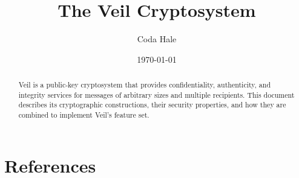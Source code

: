 \documentclass{article}
\title{The Veil Cryptosystem}
\author{Coda Hale}
\date{\today}
\begin{document}
    \clearpage
    \maketitle
    \begin{abstract}
        Veil is a public-key cryptosystem that provides confidentiality, authenticity, and integrity services for
        messages of arbitrary sizes and multiple recipients.
        This document describes its cryptographic constructions, their security properties, and how they are combined to
        implement Veil's feature set.
    \end{abstract}

    \clearpage
    \tableofcontents

    \clearpage
    \listofalgorithms

    
    
    
    
    
    
    
    
    


    \section{References}\label{sec:references}
    
\end{document}
